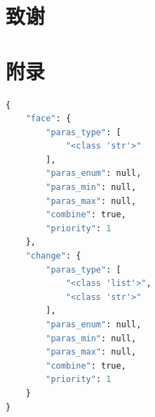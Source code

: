 \documentclass[a4paper,AutoFakeBold,oneside,12pt]{book}
\begin{document}
\begin{nopagenumber}
\clearpage{}


\clearpage
\chapter{致\qquad{}谢}
\normalsize\thankwords

\setcounter{figure}{0} 
\renewcommand{\thefigure}{~附-\arabic{figure}~}
\setcounter{equation}{0} 
\renewcommand{\theequation}{~附-\arabic{equation}~}
\setcounter{table}{0} 
\renewcommand{\thetable}{~附-\arabic{table}~}
\setcounter{lstlisting}{0} 
\makeatletter
  \renewcommand \thelstlisting
       {附-\@arabic\c@lstlisting}
\makeatother


\chapter*{附\qquad{}录}
\begin{lstlisting}[language=Python, caption=指令校验规则, label=plus, tabsize=2]  
    {
    "face": {
        "paras_type": [
            "<class 'str'>"
        ],
        "paras_enum": null,
        "paras_min": null,
        "paras_max": null,
        "combine": true,
        "priority": 1
    },
    "change": {
        "paras_type": [
            "<class 'list'>",
            "<class 'str'>"
        ],
        "paras_enum": null,
        "paras_min": null,
        "paras_max": null,
        "combine": true,
        "priority": 1
    }
}
\end{lstlisting} 




\end{nopagenumber}
\end{document}
